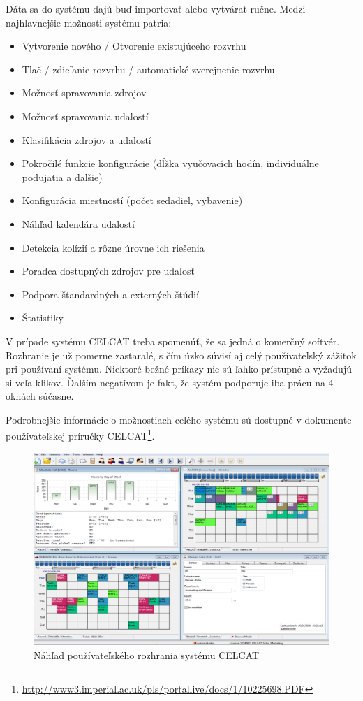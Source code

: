 Dáta sa do systému dajú buď importovať alebo vytvárať ručne. Medzi najhlavnejšie možnosti systému patria:
\begin{itemize}
\item Vytvorenie nového / Otvorenie existujúceho rozvrhu
\item Tlač / zdieľanie rozvrhu / automatické zverejnenie rozvrhu
\item Možnosť spravovania zdrojov
\item Možnosť spravovania udalostí
\item Klasifikácia zdrojov a udalostí
\item Pokročilé funkcie konfigurácie (dĺžka vyučovacích hodín, individuálne podujatia a ďalšie)
\item Konfigurácia miestností (počet sedadiel, vybavenie)
\item Náhľad kalendára udalostí
\item Detekcia kolízií a rôzne úrovne ich riešenia
\item Poradca dostupných zdrojov pre udalosť
\item Podpora štandardných a externých štúdií
\item Štatistiky
\end{itemize}

V prípade systému CELCAT treba spomenúť, že sa jedná o komerčný softvér. Rozhranie je už pomerne zastaralé,
s čím úzko súvisí aj celý používateľský zážitok pri používaní systému. Niektoré bežné príkazy nie sú ľahko prístupné
a vyžadujú si veľa klikov. Ďalším negatívom je fakt, že systém podporuje iba prácu na 4 oknách súčasne.

Podrobnejšie informácie o možnostiach celého systému sú dostupné v dokumente používateľskej príručky
CELCAT\footnote{\url{http://www3.imperial.ac.uk/pls/portallive/docs/1/10225698.PDF}}.

\newpage
\begin{figure}[ht]
  \centering
  \includegraphics[width=0.71\columnwidth]{img/celcat.jpg}
  \caption{\label{fig:celcat_gui} Náhľad používateľského rozhrania systému CELCAT \cite{celcat}}
\end{figure}

